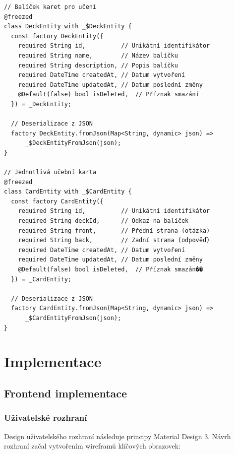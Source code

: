 \documentclass[12pt, a4paper, twoside, openright]{report}
\begin{document}
	\begin{lstlisting}[style=Python, caption=Definice datových modelů]
// Balíček karet pro učení
@freezed
class DeckEntity with _$DeckEntity {
  const factory DeckEntity({
    required String id,          // Unikátní identifikátor
    required String name,        // Název balíčku
    required String description, // Popis balíčku
    required DateTime createdAt, // Datum vytvoření
    required DateTime updatedAt, // Datum poslední změny
    @Default(false) bool isDeleted,  // Příznak smazání
  }) = _DeckEntity;

  // Deserializace z JSON
  factory DeckEntity.fromJson(Map<String, dynamic> json) => 
      _$DeckEntityFromJson(json);
}

// Jednotlivá učební karta
@freezed
class CardEntity with _$CardEntity {
  const factory CardEntity({
    required String id,          // Unikátní identifikátor
    required String deckId,      // Odkaz na balíček
    required String front,       // Přední strana (otázka)
    required String back,        // Zadní strana (odpověď)
    required DateTime createdAt, // Datum vytvoření
    required DateTime updatedAt, // Datum poslední změny
    @Default(false) bool isDeleted,  // Příznak smazán��
  }) = _CardEntity;

  // Deserializace z JSON
  factory CardEntity.fromJson(Map<String, dynamic> json) => 
      _$CardEntityFromJson(json);
}
	\end{lstlisting}

\chapter{Implementace}
	\section{Frontend implementace}
	\subsection{Uživatelské rozhraní}
	Design uživatelského rozhraní následuje principy Material Design 3. Návrh rozhraní začal vytvořením wireframů klíčových obrazovek:
\end{document}
